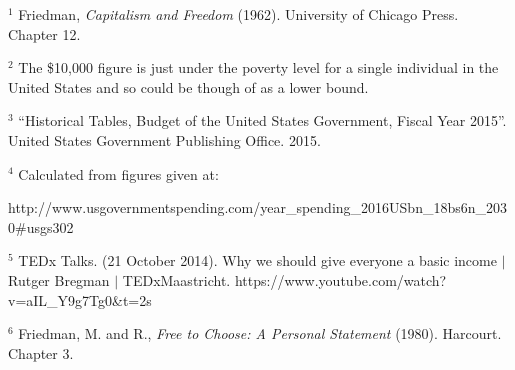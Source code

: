 \documentclass[12pt]{article}
\begin{document}
\begin{footnotesize}
\noindent $^1$ Friedman, \emph{Capitalism and Freedom} (1962). University of Chicago Press. Chapter 12.
\smallskip

\noindent $^2$ The \$10,000 figure is just under the poverty level for a single individual in the United States and so could be though of as a lower bound.

\smallskip

\noindent $^3$ ``Historical Tables, Budget of the United States Government, Fiscal Year 2015''. United States Government Publishing Office. 2015.
\smallskip


\noindent $^4$ Calculated from figures given at:

\noindent http://www.usgovernmentspending.com/year\_spending\_2016USbn\_18bs6n\_2030\#usgs302
\smallskip

\noindent $^5$ TEDx Talks. (21 October 2014). Why we should give everyone a basic income $|$ Rutger Bregman $|$ TEDxMaastricht. https://www.youtube.com/watch?v=aIL\_Y9g7Tg0\&t=2s
\smallskip

\noindent $^6$ Friedman, M. and R., \emph{Free to Choose: A Personal Statement} (1980). Harcourt. Chapter 3.

\end{footnotesize}
\end{document}
